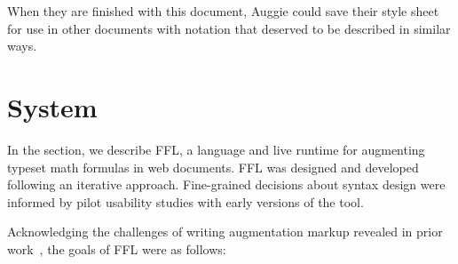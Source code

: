 When they are finished with this document, Auggie could save their style sheet for use in other documents with notation that deserved to be described in similar ways.







\section{System}

In the section, we describe FFL, a language and live runtime for augmenting typeset math formulas in web documents. FFL was designed and developed following an iterative approach. Fine-grained decisions about syntax design were informed by pilot usability studies with early versions of the tool.

Acknowledging the challenges of writing augmentation markup revealed in prior work~\cite{ref:head2022math}, the goals of FFL were as follows:


